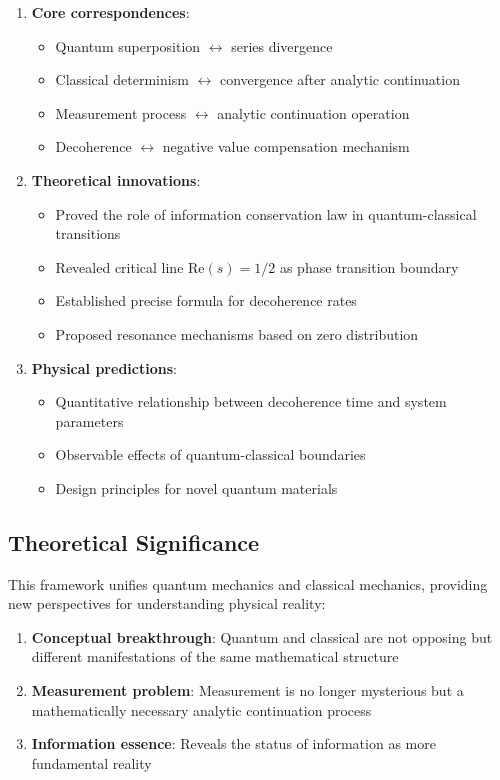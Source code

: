 \documentclass[11pt]{article}
\theoremstyle{plain}
\theoremstyle{definition}
\theoremstyle{remark}
\begin{document}
\begin{enumerate}
\item \textbf{Core correspondences}:
   \begin{itemize}
   \item Quantum superposition $\leftrightarrow$ series divergence
   \item Classical determinism $\leftrightarrow$ convergence after analytic continuation
   \item Measurement process $\leftrightarrow$ analytic continuation operation
   \item Decoherence $\leftrightarrow$ negative value compensation mechanism
   \end{itemize}

\item \textbf{Theoretical innovations}:
   \begin{itemize}
   \item Proved the role of information conservation law in quantum-classical transitions
   \item Revealed critical line $\text{Re}(s) = 1/2$ as phase transition boundary
   \item Established precise formula for decoherence rates
   \item Proposed resonance mechanisms based on zero distribution
   \end{itemize}

\item \textbf{Physical predictions}:
   \begin{itemize}
   \item Quantitative relationship between decoherence time and system parameters
   \item Observable effects of quantum-classical boundaries
   \item Design principles for novel quantum materials
   \end{itemize}
\end{enumerate}

\subsection{Theoretical Significance}

This framework unifies quantum mechanics and classical mechanics, providing new perspectives for understanding physical reality:

\begin{enumerate}
\item \textbf{Conceptual breakthrough}: Quantum and classical are not opposing but different manifestations of the same mathematical structure
\item \textbf{Measurement problem}: Measurement is no longer mysterious but a mathematically necessary analytic continuation process
\item \textbf{Information essence}: Reveals the status of information as more fundamental reality
\end{enumerate}
\end{document}
